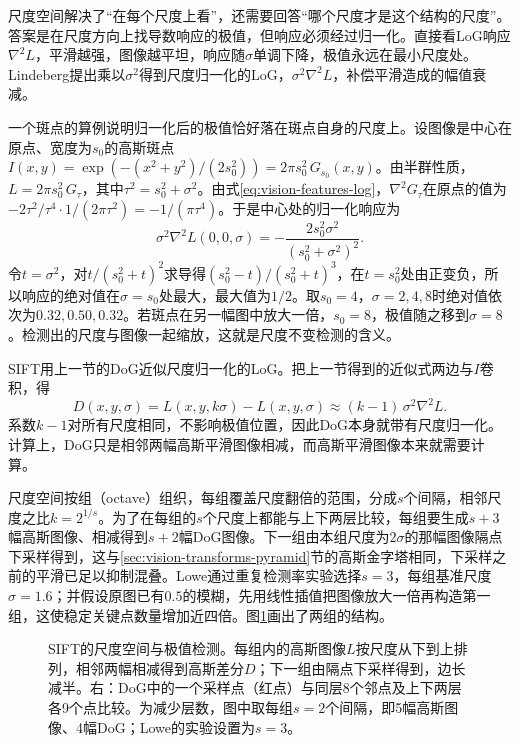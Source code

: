 尺度空间解决了“在每个尺度上看”，还需要回答“哪个尺度才是这个结构的尺度”。答案是在尺度方向上找导数响应的极值，但响应必须经过归一化。直接看LoG响应$\nabla^2L$，平滑越强，图像越平坦，响应随$\sigma$单调下降，极值永远在最小尺度处。Lindeberg提出乘以$\sigma^2$得到尺度归一化的LoG，$\sigma^2\nabla^2L$，补偿平滑造成的幅值衰减。

一个斑点的算例说明归一化后的极值恰好落在斑点自身的尺度上。设图像是中心在原点、宽度为$s_0$的高斯斑点$I(x,y)=\exp(-(x^2+y^2)/(2s_0^2))=2\pi s_0^2\,G_{s_0}(x,y)$。由半群性质，$L=2\pi s_0^2\,G_{\tau}$，其中$\tau^2=s_0^2+\sigma^2$。由式\eqref{eq:vision-features-log}，$\nabla^2G_{\tau}$在原点的值为$-2\tau^2/\tau^4\cdot1/(2\pi\tau^2)=-1/(\pi\tau^4)$。于是中心处的归一化响应为
\[
  \sigma^2\nabla^2L(0,0,\sigma)=-\frac{2s_0^2\sigma^2}{(s_0^2+\sigma^2)^2}.
\]
令$t=\sigma^2$，对$t/(s_0^2+t)^2$求导得$(s_0^2-t)/(s_0^2+t)^3$，在$t=s_0^2$处由正变负，所以响应的绝对值在$\sigma=s_0$处最大，最大值为$1/2$。取$s_0=4$，$\sigma=2,4,8$时绝对值依次为$0.32,0.50,0.32$。若斑点在另一幅图中放大一倍，$s_0=8$，极值随之移到$\sigma=8$。检测出的尺度与图像一起缩放，这就是尺度不变检测的含义。

SIFT用上一节的DoG近似尺度归一化的LoG。把上一节得到的近似式两边与$I$卷积，得
\begin{equation}
  D(x,y,\sigma)=L(x,y,k\sigma)-L(x,y,\sigma)\approx(k-1)\,\sigma^2\nabla^2L.
  \label{eq:vision-features-dog}
\end{equation}
系数$k-1$对所有尺度相同，不影响极值位置，因此DoG本身就带有尺度归一化。计算上，DoG只是相邻两幅高斯平滑图像相减，而高斯平滑图像本来就需要计算。

尺度空间按组（octave）组织，每组覆盖尺度翻倍的范围，分成$s$个间隔，相邻尺度之比$k=2^{1/s}$。为了在每组的$s$个尺度上都能与上下两层比较，每组要生成$s+3$幅高斯图像、相减得到$s+2$幅DoG图像。下一组由本组尺度为$2\sigma$的那幅图像隔点下采样得到，这与\ref{sec:vision-transforms-pyramid}节的高斯金字塔相同，下采样之前的平滑已足以抑制混叠。Lowe通过重复检测率实验选择$s=3$，每组基准尺度$\sigma=1.6$；并假设原图已有$0.5$的模糊，先用线性插值把图像放大一倍再构造第一组，这使稳定关键点数量增加近四倍。图\ref{fig:vision-features-sift-scale-space}画出了两组的结构。

\begin{figure}[tbp]
  \centering
  
  \caption{SIFT的尺度空间与极值检测。每组内的高斯图像$L$按尺度从下到上排列，相邻两幅相减得到高斯差分$D$；下一组由隔点下采样得到，边长减半。右：DoG中的一个采样点（红点）与同层8个邻点及上下两层各9个点比较。为减少层数，图中取每组$s=2$个间隔，即5幅高斯图像、4幅DoG；Lowe的实验设置为$s=3$。}
  \label{fig:vision-features-sift-scale-space}
\end{figure}

